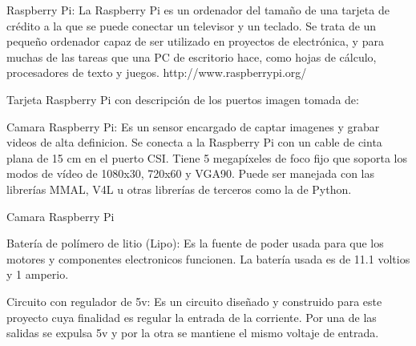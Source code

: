 Raspberry Pi: La Raspberry Pi es un ordenador del tamaño de una tarjeta de crédito a la que se puede conectar un televisor y un teclado. Se trata de un pequeño ordenador capaz de ser utilizado en proyectos de electrónica, y para muchas de las tareas que una PC de escritorio hace, como hojas de cálculo, procesadores de texto y juegos. http://www.raspberrypi.org/ 


Tarjeta Raspberry Pi con descripción de los puertos
imagen tomada de: %


Camara Raspberry Pi: Es un sensor encargado de captar imagenes y grabar videos de alta definicion. Se conecta a la Raspberry Pi con un cable de cinta plana de 15 cm en el puerto CSI. Tiene 5 megapíxeles de foco fijo que soporta los modos de vídeo de 1080x30, 720x60 y VGA90. Puede ser manejada con las librerías MMAL, V4L u otras librerías de terceros como la de Python. %


Camara Raspberry Pi 

Batería de polímero de litio (Lipo): Es la fuente de poder usada para que los motores y componentes electronicos funcionen. La batería usada es de 11.1 voltios y 1 amperio. 

Circuito con regulador de 5v: Es un circuito diseñado y construido para este proyecto cuya finalidad es regular la entrada de la corriente. Por una de las salidas se expulsa 5v y por la otra se mantiene el mismo voltaje de entrada. 


